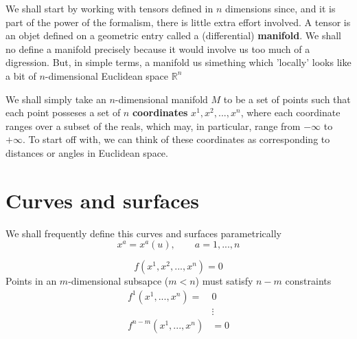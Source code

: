 We shall start by working with tensors defined in $n$ dimensions since, and it is part of the power of the formalism, there is little extra effort involved. A tensor is an objet defined on a geometric entry called a (differential) \textbf{manifold}. We shall no define a manifold precisely because it would involve us too much of a digression. But, in simple terms, a manifold us simething which 'locally' looks like a bit of $n$-dimensional Euclidean space $\mathbb{R}^{n}$

We shall simply take an $n$-dimensional manifold $M$ to be a set of points such that each point posseses a set of $n$ \textbf{coordinates} $x^{1},x^{2},...,x^{n}$, where each coordinate ranges over a subset of the reals, which may, in particular, range from $-\infty$ to $+\infty$. To start off with, we can think of these coordinates as corresponding to distances or angles in Euclidean space.

\section{Curves and surfaces}
We shall frequently define this curves and surfaces parametrically
\begin{equation}\label{5.1}
  x^{a} = x^{a}(u), \qquad a=1,...,n 
\end{equation}

\begin{equation}       \label{5.3}
  f(x^1,x^2,..., x^n)=0
\end{equation}
Points in an $m$-dimensional subsapce ($m<n$) must satisfy $n-m$ constraints
\begin{align}
\nonumber  f^1(x^1,...,x^n)=&0\\
\label{5.4}          &\vdots    \\
  \nonumber f^{n-m}(x^1,...,x^n)&=0
\end{align}

